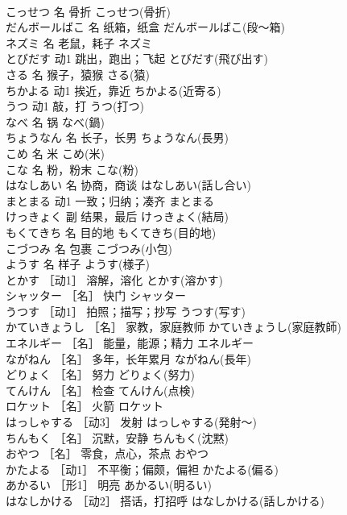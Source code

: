 \documentclass[8pt]{extreport}
\begin{document}
\begin{CJK}{UTF8}{min}
\\	こっせつ	名	骨折	こっせつ(骨折)	
\\	だんボールばこ	名	纸箱，纸盒	だんボールばこ(段～箱)	
\\	ネズミ	名	老鼠，耗子	ネズミ	
\\	とびだす	动1	跳出，跑出；飞起	とびだす(飛び出す)	
\\	さる	名	猴子，猿猴	さる(猿)	
\\	ちかよる	动1	挨近，靠近	ちかよる(近寄る)	
\\	うつ	动1	敲，打	うつ(打つ)	
\\	なべ	名	锅	なべ(鍋)	
\\	ちょうなん	名	长子，长男	ちょうなん(長男)	
\\	こめ	名	米	こめ(米)	
\\	こな	名	粉，粉末	こな(粉)	
\\	はなしあい	名	协商，商谈	はなしあい(話し合い)	
\\	まとまる	动1	一致；归纳；凑齐	まとまる	
\\	けっきょく	副	结果，最后	けっきょく(結局)	
\\	もくてきち	名	目的地	もくてきち(目的地)	
\\	こづつみ	名	包裹	こづつみ(小包)	
\\	ようす	名	样子	ようす(様子)	
\\	とかす	［动1］	溶解，溶化	とかす(溶かす)	
\\	シャッター	［名］	快门	シャッター	
\\	うつす	［动1］	拍照；描写；抄写	うつす(写す)	
\\	かていきょうし	［名］	家教，家庭教师	かていきょうし(家庭教師)	
\\	エネルギー	［名］	能量，能源；精力	エネルギー	
\\	ながねん	［名］	多年，长年累月	ながねん(長年)	
\\	どりょく	［名］	努力	どりょく(努力)	
\\	てんけん	［名］	检查	てんけん(点検)	
\\	ロケット	［名］	火箭	ロケット	
\\	はっしゃする	［动3］	发射	はっしゃする(発射～)	
\\	ちんもく	［名］	沉默，安静	ちんもく(沈黙)	
\\	おやつ	［名］	零食，点心，茶点	おやつ	
\\	かたよる	［动1］	不平衡；偏颇，偏袒	かたよる(偏る)	
\\	あかるい	［形1］	明亮	あかるい(明るい)	
\\	はなしかける	［动2］	搭话，打招呼	はなしかける(話しかける)	

\end{CJK}
\end{document}
